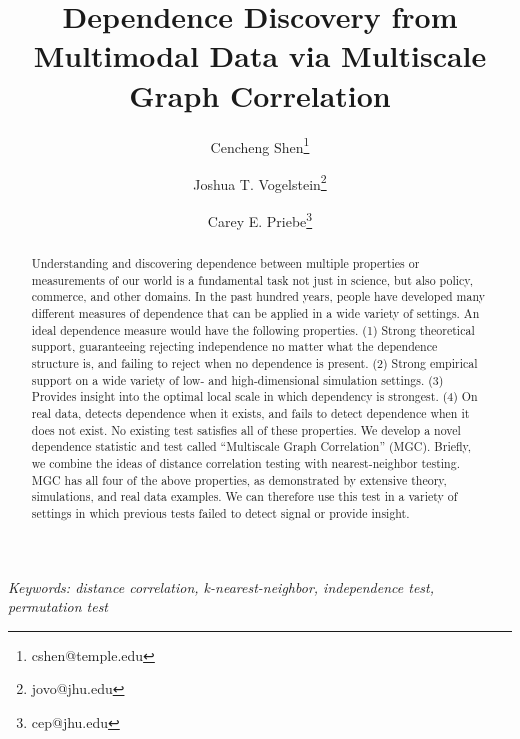 \documentclass[11pt]{article}
\begin{document}
\def\spacingset#1{\renewcommand{\baselinestretch}%
{#1}\small\normalsize} \spacingset{1}

\title{\bf Dependence Discovery from Multimodal Data via  Multiscale Graph Correlation}
\author[1]{Cencheng Shen\thanks{cshen@temple.edu}}
\author[2]{Joshua T. Vogelstein\thanks{jovo@jhu.edu}}
\author[3]{Carey E. Priebe\thanks{cep@jhu.edu}}
\maketitle
\pagestyle{empty}

\bigskip
\begin{abstract}
Understanding and discovering dependence between multiple properties or measurements of our world is a fundamental task not just in science, but also policy, commerce, and other domains. In the past hundred years, people have developed many different measures of dependence that can be applied in a wide variety of settings.  An ideal dependence measure would have the following properties. (1) Strong theoretical support, guaranteeing rejecting independence no matter what the dependence structure is, and failing to reject when no dependence is present. (2) Strong empirical support on a wide variety of low- and high-dimensional simulation settings. (3) Provides insight into the optimal local scale in which dependency is strongest. (4) On real data, detects dependence when it exists, and fails to detect dependence when it does not exist. No existing test satisfies all of these properties. We develop a novel dependence statistic and test called ``Multiscale Graph Correlation'' (MGC).  Briefly, we combine the ideas of distance correlation testing with nearest-neighbor testing.  MGC has all four of the above properties, as demonstrated by extensive theory, simulations, and real data examples. We can therefore use this test in a variety of settings in which previous tests failed to detect signal or provide insight.
\end{abstract}

\noindent%
{\it Keywords: distance correlation, k-nearest-neighbor, independence test, permutation test}  
\vfill

\clearpage
\tableofcontents

\end{document}
